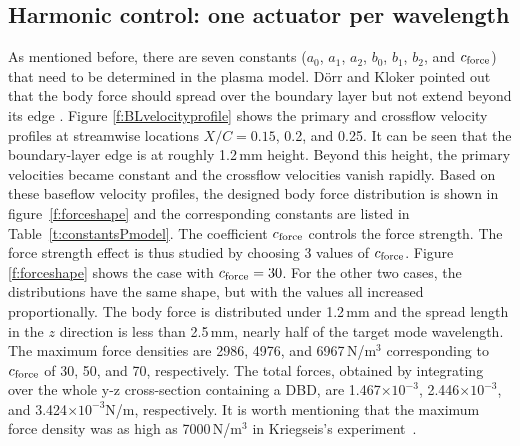 \subsection{Harmonic control: one actuator per wavelength}\label{subs:control1}
As mentioned before, there are seven constants ($a_0$, $a_1$, $a_2$, $b_0$, $b_1$, $b_2$, and $c_{\rm force}$) that need to be determined in the plasma model. D\"orr and Kloker pointed out that the body force should spread over the boundary layer but  not extend beyond its edge \cite{dorr2015stabilisation}. Figure \ref{f:BLvelocityprofile} shows the primary  and  crossflow velocity profiles at streamwise locations $X/C=0.15$, 0.2, and 0.25. It can be seen that the boundary-layer edge is at roughly  1.2\,mm height. Beyond this height, the primary velocities became constant and the crossflow velocities vanish rapidly. Based on these baseflow velocity profiles, the designed body force distribution is shown in figure~\ref{f:forceshape} and the corresponding constants are listed in Table~\ref{t:constantsPmodel}. The coefficient $c_{\rm force}$ controls the force strength. The force strength effect is thus studied by choosing 3 values of $c_{\rm force}$. Figure \ref{f:forceshape}  shows the case with $c_{\rm force}=30$. For the other two cases, the distributions have the same shape, but with the values  all increased proportionally. The body force is distributed under 1.2\,mm and the spread length in the $z$ direction is less than 2.5\,mm, nearly  half of the target mode wavelength. The maximum force densities are 2986, 4976, and 6967\,N/m$^3$ corresponding to $c_{\rm force}$ of 30, 50, and 70, respectively. The total forces, obtained by integrating over the whole y-z cross-section containing a DBD, are 1.467$\times 10^{-3}$, 2.446$\times 10^{-3}$, and 3.424$\times 10^{-3}$N/m, respectively. It is worth mentioning that the maximum force density was as high as 7000\,N/m$^3$ in Kriegseis's experiment~\cite{kriegseis2013velocity}.

